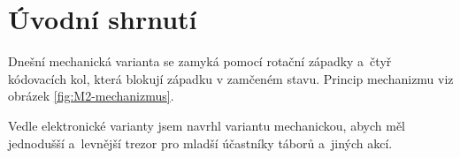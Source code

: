\section{Úvodní shrnutí}

Dnešní mechanická varianta se zamyká pomocí rotační západky a~čtyř kódovacích kol, která blokují západku v zamčeném stavu. \newline
Princip mechanizmu viz obrázek \ref{fig:M2-mechanizmus}.

Vedle elektronické varianty jsem navrhl variantu mechanickou, abych měl jednodušší a~levnější trezor pro mladší účastníky táborů a~jiných akcí. 

\newpage